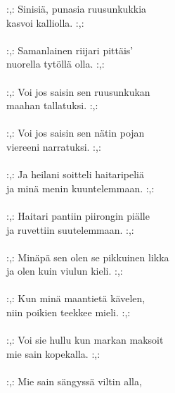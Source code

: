 
            :,: Sinisiä, punasia ruusunkukkia  \\
            kasvoi kalliolla. :,: \\
\hspace{10mm} \\
            :,: Samanlainen riijari pittäis' \\
            nuorella tytöllä olla. :,: \\
\hspace{10mm} \\
            :,: Voi jos saisin sen ruusunkukan  \\
            maahan tallatuksi. :,: \\
\hspace{10mm} \\
            :,: Voi jos saisin sen nätin pojan  \\
            viereeni narratuksi. :,: \\
\hspace{10mm} \\
            :,: Ja heilani soitteli haitaripeliä  \\
            ja minä menin kuuntelemmaan. :,: \\
\hspace{10mm} \\
            :,: Haitari pantiin piirongin piälle \\
            ja ruvettiin suutelemmaan. :,:  \\
\hspace{10mm} \\
            :,: Minäpä sen olen se pikkuinen likka \\
            ja olen kuin viulun kieli. :,: \\
\hspace{10mm} \\
            :,: Kun minä maantietä kävelen,  \\
            niin poikien teekkee mieli. :,: \\
\hspace{10mm} \\
            :,: Voi sie hullu kun markan maksoit  \\
            mie sain kopekalla. :,: \\
\hspace{10mm} \\
            :,: Mie sain sängyssä viltin alla,  \\
